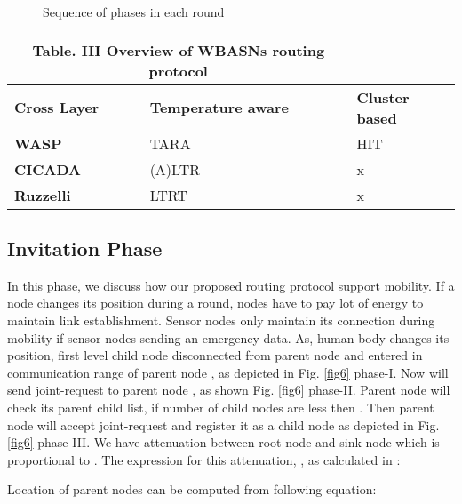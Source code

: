 \documentclass[journal]{IEEEtran}
\begin{document}
\begin{figure*}[ht]
  \centering
  \caption{Sequence of phases in each round}\label{fig7}
\end{figure*}


\begin{table}[!ht]
\begin{center}
\begin{tabular}{| p{1.6cm} || p{1.5cm} || p{1.5cm} |}
   \multicolumn{2}{c}{Table. III Overview of WBASNs routing protocol}\\
  \hline
  \textbf{Cross Layer}                & \textbf{Temperature aware }&      \textbf{Cluster based}   \\ \hline \hline
   \textbf{WASP}                      & TARA	                   &       HIT \\ \hline
    \textbf{CICADA}                   & (A)LTR                     &       x\\ \hline
     \textbf{Ruzzelli}                & LTRT                       &       x\\ \hline

\end{tabular}
\end{center}
\end{table}



\subsection{Invitation Phase}
In this phase, we discuss how our proposed routing protocol support mobility. If a node changes its position during a round, nodes have to pay lot of energy to maintain link establishment. Sensor nodes only maintain its connection during mobility if sensor nodes sending an emergency data. As, human body changes its position, first level child node  disconnected from parent node  and entered in communication range of parent node , as depicted in Fig. \ref{fig6} phase-I. Now  will send joint-request to parent node , as shown Fig. \ref{fig6} phase-II. Parent node will check its parent child list, if number of child nodes are less then . Then parent node  will accept joint-request and register  it as a child node as depicted in Fig. \ref{fig6} phase-III.
We have attenuation between root node and sink node which is proportional to . The expression for this attenuation, , as calculated in \cite{4726120}:

Location of parent nodes can be computed from following equation:
\end{document}
